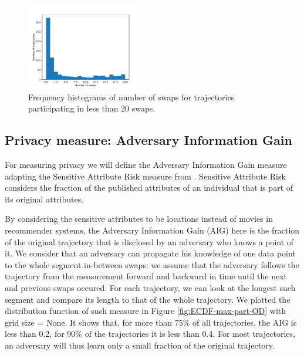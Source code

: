 \documentclass[times,twocolumn,final,authoryear]{elsarticle}
\begin{document}
\begin{figure}
    \includegraphics[width=0.45\textwidth]{figures/swaps-distribution-20.pdf}
  \caption{Frequency histograms of number of swaps for trajectories participating in less than 20 swaps.}
  \label{fig:swaps-distribution}%
\end{figure}

\subsection{Privacy measure: Adversary Information Gain}\label{Sec:InfoGain}
 
For measuring privacy we will define the Adversary Information Gain measure adapting the Sensitive Attribute Risk measure from \cite{Salas:2019}. Sensitive Attribute Risk considers the fraction of the published attributes of an individual that is part of its original attributes. 

By considering the sensitive attributes to be locations instead of movies in recommender systems, the Adversary Information Gain (AIG) here is the fraction of the original trajectory that is disclosed by an adversary who knows a point of it.
We consider that an adversary can propagate his knowledge of one data point to the whole segment in-between swaps: we assume that the adversary follows the trajectory from the measurement forward and backward in time until the next and previous swaps occured. 
For each trajectory, we can look at the longest such segment and compare its length to that of the
whole trajectory. 
We plotted the distribution function of such measure in Figure \ref{fig:ECDF-max-part-OD} with grid size = None. It shows that, for more than 75\% of all
trajectories, the AIG is less than 0.2, for 90\% of the trajectories it is less
than 0.4. For most trajectories, an adversary will thus learn only a
small fraction of the original trajectory.
\end{document}
